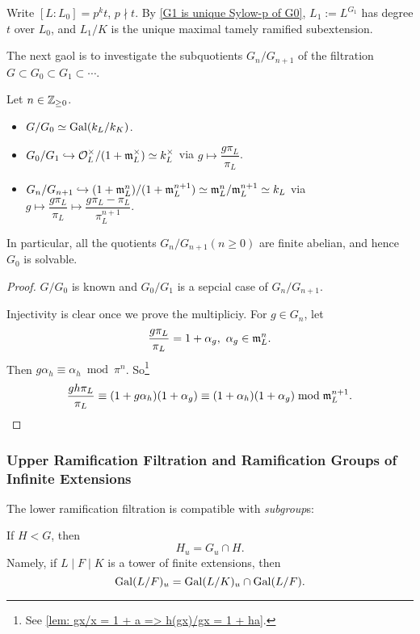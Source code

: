 Write $[L : L_0] = p^kt$, $p\nmid t$.
By \cref{G1 is unique Sylow-p of G0},
$L_1 := L^{G_1}$ has degree $t$ over $L_0$, and $L_1/K$ is the unique maximal tamely ramified subextension.

The next gaol is to investigate the subquotients $G_n/G_{n+1}$ of the filtration $G\subset G_0\subset G_1\subset\cdots$.

\begin{proposition}\label{subquotients of lower ramification filtration}
    Let $n\in \mathbb{Z}_{\ge 0}$.
\begin{itemize}
    \item $G/G_0\simeq\operatorname{Gal}(k_L/k_K)$.
    \item $G_0/G_1\hookrightarrow \mathcal{O}_L^\times/(1 + \mathfrak{m}_L^\times)\simeq k_L^\times$ via $g\mapsto \dfrac{g\pi_L }{\pi_L } $.
    \item $G_n/G_{n+1}\hookrightarrow (1 + \mathfrak{m}_L^n)/(1 + \mathfrak{m}_L^{n+1})\simeq \mathfrak{m}_L^n/\mathfrak{m}_L^{n+1}\simeq k_L$ via $g\mapsto \dfrac{g\pi_L }{\pi_L } \mapsto \dfrac{g\pi_L - \pi_L}{\pi_L^{n+1}}$.
\end{itemize}
In particular, all the quotients $G_n/G_{n+1}(n\ge 0)$ are finite abelian, and hence $G_0$ is solvable.
\end{proposition}
\begin{proof}
    $G/G_0$ is known and $G_0/G_1$ is a sepcial case of $G_n/G_{n+1}$.

    Injectivity is clear once we prove the multipliciy.
    For $g\in G_n$, let \[\frac{g\pi_L}{\pi_L} = 1 + \alpha_g,\ \alpha_g\in\m_L^n.\]
    Then $g\alpha_h \equiv\alpha_h\bmod \pi^n$.
    So\footnote{See \ref{lem: gx/x = 1 + a => h(gx)/gx = 1 + ha}.}
     \[
    \dfrac{gh\pi_L}{\pi_L} \equiv (1 + g\alpha_h)(1 + \alpha_g)\equiv (1 + \alpha_h)(1 + \alpha_g)\bmod\mathfrak{m}_L^{n+1}.\qedhere
    \]
\end{proof}



\subsubsection{Upper Ramification Filtration and Ramification Groups of Infinite Extensions}

The lower ramification filtration is compatible with \textit{subgroup}s:
\begin{proposition}
    If $H < G$, then \[H_u = G_u\cap H.\]
    Namely, if $L\mid F\mid K$ is a tower of finite extensions,
    then \[\operatorname{Gal}(L/F)_u = \operatorname{Gal}(L/K)_u\cap \operatorname{Gal}(L/F).\]
\end{proposition}

